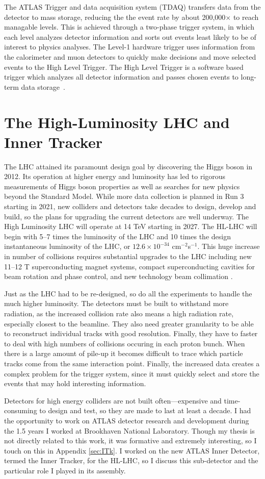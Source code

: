 The ATLAS Trigger and data acquisition system (TDAQ) transfers data from the detector to mass storage, reducing the the event rate by about 200,000$\times$ to reach managable levels. This is achieved through a two-phase trigger system, in which each level analyzes detector information and sorts out events least likely to be of interest to physics analyses. The Level-1 hardware trigger uses information from the calorimeter and muon detectors to quickly make decisions and move selected events to the High Level Trigger. The High Level Trigger is a software based trigger which analyzes all detector information and passes chosen events to long-term data storage~\cite{TDAQ}. 

\section{The High-Luminosity LHC and Inner Tracker}
The LHC attained its paramount design goal by discovering the Higgs boson in 2012. Its operation at higher energy and luminosity has led to rigorous measurements of Higgs boson properties as well as searches for new physics beyond the Standard Model. While more data collection is planned in Run 3 starting in 2021, new colliders and detectors take decades to design, develop and build, so the plans for upgrading the current detectors are well underway. The High Luminosity LHC will operate at 14 TeV starting in 2027. The HL-LHC will begin with 5--7 times the luminosity of the LHC and 10 times the design instantaneous luminosity of the LHC, or $12.6\times10^{-34}$ cm$^{-2}$s$^{-1}$. This huge increase in number of collisions requires substantial upgrades to the LHC including new 11--12 T superconducting magnet systems, compact superconducting cavities for beam rotation and phase control, and new technology beam collimation \cite{HLLHCYellow}. 

Just as the LHC had to be re-designed, so do all the experiments to handle the much higher luminosity. The detectors must be built to withstand more radiation, as the increased collision rate also means a high radiation rate, especially closest to the beamline. They also need greater granularity to be able to reconstruct individual tracks with good resolution. Finally, they have to faster to deal with high numbers of collisions occuring in each proton bunch. When there is a large amount of pile-up it becomes difficult to trace which particle tracks come from the same interaction point. Finally, the increased data creates a complex problem for the trigger system, since it must quickly select and store the events that may hold interesting information. 

Detectors for high energy colliders are not built often---expensive and time-consuming to design and test, so they are made to last at least a decade. I had the opportunity to work on ATLAS detector research and development during the 1.5 years I worked at Brookhaven National Laboratory. Though my thesis is not directly related to this work, it was formative and extremely interesting, so I touch on this in Appendix \ref{sec:ITk}. I worked on the new ATLAS Inner Detector, termed the Inner Tracker, for the HL-LHC, so I discuss this sub-detector and the particular role I played in its assembly.

